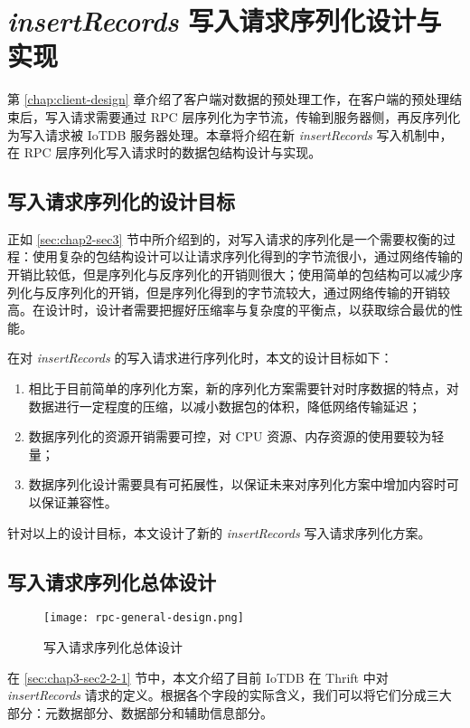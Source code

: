 
\chapter{\emph{insertRecords} 写入请求序列化设计与实现\label{sec:chap6}}
第 \ref{chap:client-design} 章介绍了客户端对数据的预处理工作，在客户端的预处理结束后，写入请求需要通过 RPC 层序列化为字节流，传输到服务器侧，再反序列化为写入请求被 IoTDB 服务器处理。本章将介绍在新 \emph{insertRecords} 写入机制中，在 RPC 层序列化写入请求时的数据包结构设计与实现。

\section{写入请求序列化的设计目标}
正如 \ref{sec:chap2-sec3} 节中所介绍到的，对写入请求的序列化是一个需要权衡的过程：使用复杂的包结构设计可以让请求序列化得到的字节流很小，通过网络传输的开销比较低，但是序列化与反序列化的开销则很大；使用简单的包结构可以减少序列化与反序列化的开销，但是序列化得到的字节流较大，通过网络传输的开销较高。在设计时，设计者需要把握好压缩率与复杂度的平衡点，以获取综合最优的性能。

在对 \emph{insertRecords} 的写入请求进行序列化时，本文的设计目标如下：
\begin{enumerate}
  \item 相比于目前简单的序列化方案，新的序列化方案需要针对时序数据的特点，对数据进行一定程度的压缩，以减小数据包的体积，降低网络传输延迟；
  \item 数据序列化的资源开销需要可控，对 CPU 资源、内存资源的使用要较为轻量；
  \item 数据序列化设计需要具有可拓展性，以保证未来对序列化方案中增加内容时可以保证兼容性。
\end{enumerate}
针对以上的设计目标，本文设计了新的 \emph{insertRecords} 写入请求序列化方案。

\section{写入请求序列化总体设计}
\begin{figure}
  \centering
  \texttt{[image: rpc-general-design.png]}
  \caption{写入请求序列化总体设计}
  \label{fig:rpc-general-design}
\end{figure}

在 \ref{sec:chap3-sec2-2-1} 节中，本文介绍了目前 IoTDB 在 Thrift 中对 \emph{insertRecords} 请求的定义。根据各个字段的实际含义，我们可以将它们分成三大部分：元数据部分、数据部分和辅助信息部分。

